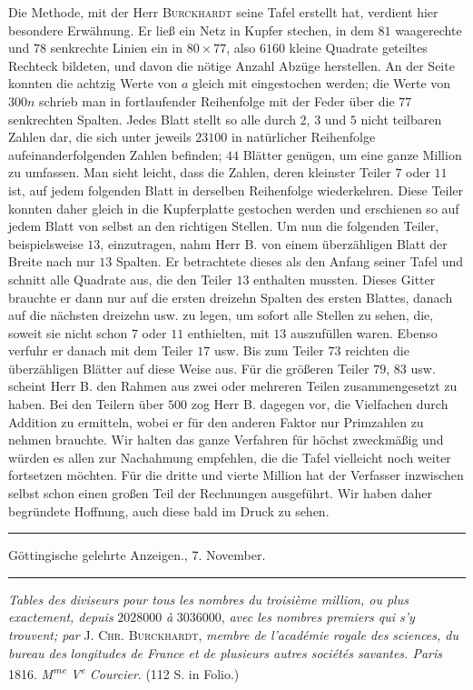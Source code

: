 Die Methode, mit der Herr \textsc{Burckhardt} seine Tafel erstellt hat, verdient hier besondere Erwähnung. Er ließ ein Netz in Kupfer stechen, in dem $81$ waagerechte und $78$ senkrechte Linien ein in $80\times77$, also $6160$ kleine Quadrate geteiltes Rechteck bildeten, und davon die nötige Anzahl Abzüge herstellen. An der Seite konnten die achtzig Werte
von $a$ gleich mit eingestochen werden; die Werte von $300n$ schrieb man in fortlaufender Reihenfolge mit der Feder über die $77$ senkrechten Spalten. Jedes Blatt stellt so alle durch $2$, $3$ und $5$ nicht teilbaren Zahlen dar, die sich unter jeweils $23100$ in natürlicher Reihenfolge aufeinanderfolgenden Zahlen befinden; $44$ Blätter genügen, um eine ganze Million zu umfassen. Man sieht leicht, dass die Zahlen, deren kleinster Teiler $7$ oder $11$ ist, auf jedem folgenden Blatt in derselben Reihenfolge wiederkehren. Diese Teiler konnten daher gleich in die Kupferplatte gestochen werden und erschienen so auf jedem Blatt von selbst an den richtigen Stellen. Um nun die folgenden Teiler, beispielsweise $13$, einzutragen, nahm Herr B. von einem überzähligen Blatt der Breite nach nur $13$ Spalten. Er betrachtete dieses als den Anfang seiner Tafel und schnitt alle Quadrate aus, die den Teiler $13$ enthalten mussten. Dieses Gitter brauchte er dann nur auf die ersten dreizehn Spalten des ersten Blattes, danach auf die nächsten dreizehn usw. zu legen, um sofort alle Stellen zu sehen, die, soweit sie nicht schon $7$ oder $11$ enthielten, mit $13$ auszufüllen waren. Ebenso verfuhr er danach mit dem Teiler $17$ usw. Bis zum Teiler $73$ reichten die überzähligen Blätter auf diese Weise aus. Für die größeren Teiler $79$, $83$ usw. scheint Herr B. den Rahmen aus zwei oder mehreren Teilen zusammengesetzt zu haben. Bei den Teilern über $500$ zog Herr B. dagegen vor, die Vielfachen durch Addition zu ermitteln, wobei er für den anderen Faktor nur Primzahlen zu nehmen brauchte. Wir halten das ganze Verfahren für höchst zweckmäßig und würden es allen zur Nachahmung empfehlen, die die Tafel vielleicht noch weiter fortsetzen möchten. Für die dritte und vierte Million hat der Verfasser inzwischen selbst schon einen großen Teil der Rechnungen ausgeführt. Wir haben daher begründete Hoffnung, auch diese bald im Druck zu sehen.

\begingroup\setlength{\topsep}{0pt}\setlength{\partopsep}{0pt}
\begin{center}
\rule{.86\linewidth}{.3pt}\par
Göttingische gelehrte Anzeigen., 7. November.\par
\rule{.86\linewidth}{.3pt}
\end{center}
\emph{Tables des diviseurs pour tous les nombres du troisième million, ou plus exactement, depuis} $2028000$ \emph{à} $3036000$, \emph{avec les nombres premiers qui s'y trouvent; par} \textsc{J. Chr. Burckhardt}, \emph{membre de l'académie royale des sciences, du bureau des }
\emph{longitudes de France et de plusieurs autres sociétés savantes. Paris} 1816. \emph{M\textsuperscript{me} V\textsuperscript{e} Courcier}. (112 S. in Folio.)


